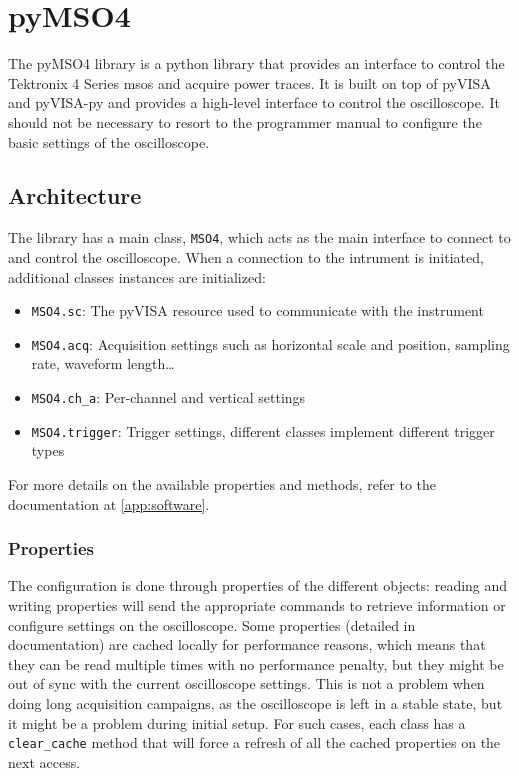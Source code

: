 \documentclass[a4paper,english,twoside,10pt]{article}
\begin{document}
\section{pyMSO4}
The pyMSO4 library is a python library that provides an interface to control the Tektronix 4 Series \glspl{mso} and acquire power traces. It is built on top of pyVISA and pyVISA-py and provides a high-level interface to control the oscilloscope. It should not be necessary to resort to the programmer manual to configure the basic settings of the oscilloscope.

\subsection{Architecture}
The library has a main class, \texttt{MSO4}, which acts as the main interface to connect to and control the oscilloscope. When a connection to the intrument is initiated, additional classes instances are initialized:
\begin{itemize}
	\item \texttt{MSO4.sc}: The pyVISA resource used to communicate with the instrument
	\item \texttt{MSO4.acq}: Acquisition settings such as horizontal scale and position, sampling rate, waveform length\ldots
	\item \texttt{MSO4.ch\_a}: Per-channel and vertical settings
	\item \texttt{MSO4.trigger}: Trigger settings, different classes implement different trigger types
\end{itemize}

For more details on the available properties and methods, refer to the documentation at \autoref{app:software}.

\subsubsection{Properties}\label{sec:properties}
The configuration is done through properties of the different objects: reading and writing properties will send the appropriate commands to retrieve information or configure settings on the oscilloscope. Some properties (detailed in documentation) are cached locally for performance reasons, which means that they can be read multiple times with no performance penalty, but they might be out of sync with the current oscilloscope settings. This is not a problem when doing long acquisition campaigns, as the oscilloscope is left in a stable state, but it might be a problem during initial setup. For such cases, each class has a \texttt{clear\_cache} method that will force a refresh of all the cached properties on the next access.
\end{document}
